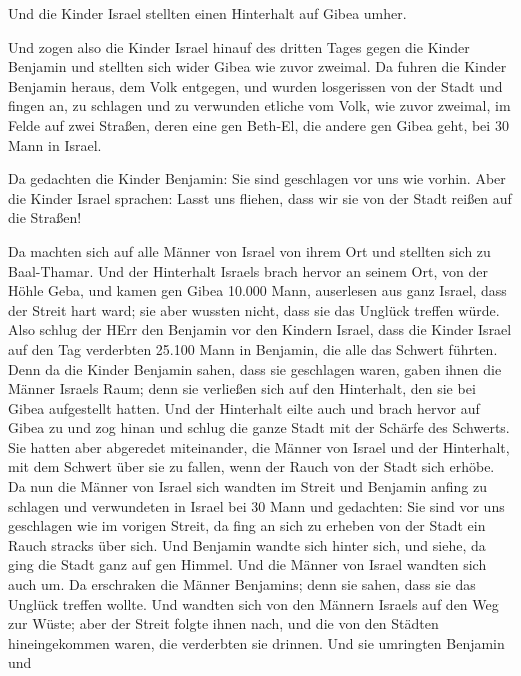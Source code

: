  Und die Kinder Israel stellten einen Hinterhalt auf Gibea
umher.

 Und zogen also die Kinder Israel hinauf des dritten Tages
gegen die Kinder Benjamin und stellten sich wider Gibea wie zuvor
zweimal.  Da fuhren die Kinder Benjamin heraus, dem Volk
entgegen, und wurden losgerissen von der Stadt und fingen an, zu
schlagen und zu verwunden etliche vom Volk, wie zuvor zweimal, im Felde
auf zwei Straßen, deren eine gen Beth-El, die andere gen Gibea geht, bei
30 Mann in Israel.

 Da gedachten die Kinder Benjamin: Sie sind geschlagen vor
uns wie vorhin. Aber die Kinder Israel sprachen: Lasst uns fliehen, dass
wir sie von der Stadt reißen auf die Straßen!

 Da machten sich auf alle Männer von Israel von ihrem Ort
und stellten sich zu Baal-Thamar. Und der Hinterhalt Israels brach
hervor an seinem Ort, von der Höhle Geba,  und kamen gen
Gibea 10.000 Mann, auserlesen aus ganz Israel, dass der Streit hart
ward; sie aber wussten nicht, dass sie das Unglück treffen würde.
 Also schlug der HErr den Benjamin vor den Kindern Israel,
dass die Kinder Israel auf den Tag verderbten 25.100 Mann in Benjamin,
die alle das Schwert führten.  Denn da die Kinder Benjamin
sahen, dass sie geschlagen waren, gaben ihnen die Männer Israels Raum;
denn sie verließen sich auf den Hinterhalt, den sie bei Gibea
aufgestellt hatten.  Und der Hinterhalt eilte auch und
brach hervor auf Gibea zu und zog hinan und schlug die ganze Stadt mit
der Schärfe des Schwerts.  Sie hatten aber abgeredet
miteinander, die Männer von Israel und der Hinterhalt, mit dem Schwert
über sie zu fallen, wenn der Rauch von der Stadt sich erhöbe.
 Da nun die Männer von Israel sich wandten im Streit und
Benjamin anfing zu schlagen und verwundeten in Israel bei 30 Mann und
gedachten: Sie sind vor uns geschlagen wie im vorigen Streit,
 da fing an sich zu erheben von der Stadt ein Rauch stracks
über sich. Und Benjamin wandte sich hinter sich, und siehe, da ging die
Stadt ganz auf gen Himmel.  Und die Männer von Israel
wandten sich auch um. Da erschraken die Männer Benjamins; denn sie
sahen, dass sie das Unglück treffen wollte.  Und wandten
sich von den Männern Israels auf den Weg zur Wüste; aber der Streit
folgte ihnen nach, und die von den Städten hineingekommen waren, die
verderbten sie drinnen.  Und sie umringten Benjamin und
